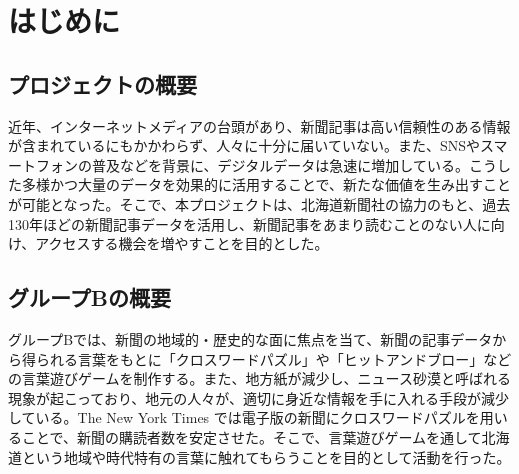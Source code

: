 \chapter{はじめに}

\section{プロジェクトの概要}
近年、インターネットメディアの台頭があり、新聞記事は高い信頼性のある情報が含まれているにもかかわらず、人々に十分に届いていない。また、SNSやスマートフォンの普及などを背景に、デジタルデータは急速に増加している。こうした多様かつ大量のデータを効果的に活用することで、新たな価値を生み出すことが可能となった。そこで、本プロジェクトは、北海道新聞社の協力のもと、過去130年ほどの新聞記事データを活用し、新聞記事をあまり読むことのない人に向け、アクセスする機会を増やすことを目的とした。

\section{グループBの概要}
グループBでは、新聞の地域的・歴史的な面に焦点を当て、新聞の記事データから得られる言葉をもとに「クロスワードパズル」や「ヒットアンドブロー」などの言葉遊びゲームを制作する。また、地方紙が減少し、ニュース砂漠と呼ばれる現象が起こっており、地元の人々が、適切に身近な情報を手に入れる手段が減少している。The New York Times では電子版の新聞にクロスワードパズルを用いることで、新聞の購読者数を安定させた。そこで、言葉遊びゲームを通して北海道という地域や時代特有の言葉に触れてもらうことを目的として活動を行った。
